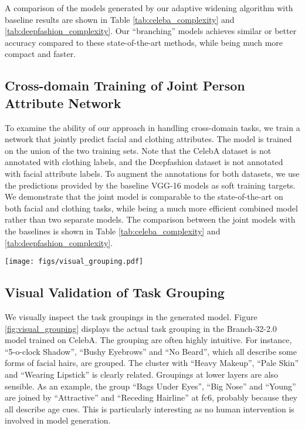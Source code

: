 \documentclass[10pt,twocolumn,letterpaper]{article}
\begin{document}
A comparison of the models generated by our adaptive widening algorithm with baseline results are shown in Table \ref{tab:celeba_complexity} and \ref{tab:deepfashion_complexity}. Our ``branching'' models achieves similar or better accuracy compared to these state-of-the-art methods, while being much more compact and faster. 

\subsection{Cross-domain Training of Joint Person Attribute Network}
\vspace{-1mm}
To examine the ability of our approach in handling cross-domain tasks, we train a network that jointly predict facial and clothing attributes. The model is trained on the union of the two training sets. Note that the CelebA dataset is not annotated with clothing labels, and the Deepfashion dataset is not annotated with facial attribute labels. To augment the annotations for both datasets, we use the predictions provided by the baseline VGG-16 models as soft training targets. We demonstrate that the joint model is comparable to the state-of-the-art on both facial and clothing tasks, while being a much more efficient combined model rather than two separate models. The comparison between the joint models with the baselines is shown in Table \ref{tab:celeba_complexity} and \ref{tab:deepfashion_complexity}.

\begin{figure*}[t]
	\begin{center}
		\texttt{[image: figs/visual\_grouping.pdf]}  
	\end{center}
	\caption{The actual task grouping in the Branch-32-2.0 model on CelebA. Upper: fc7 layer. Lower: fc6 layer. Other layers are omitted.}
	\label{fig:visual_grouping}
\end{figure*}

\vspace{-1mm}
\subsection{Visual Validation of Task Grouping}
We visually inspect the task groupings in the generated model. Figure \ref{fig:visual_grouping} displays the actual task grouping in the Branch-32-2.0 model trained on CelebA. The grouping are often highly intuitive. For instance, ``5-o-clock Shadow'', ``Bushy Eyebrows'' and ``No Beard'', which all describe some forms of facial hairs, are grouped. The cluster with ``Heavy Makeup'', ``Pale Skin'' and ``Wearing Lipstick'' is clearly related. Groupings at lower layers are also sensible. As an example, the group ``Bags Under Eyes'', ``Big Nose'' and ``Young'' are joined by ``Attractive'' and ``Receding Hairline'' at fc6, probably because they all describe age cues. This is particularly interesting as no human intervention is involved in model generation. 
\end{document}
